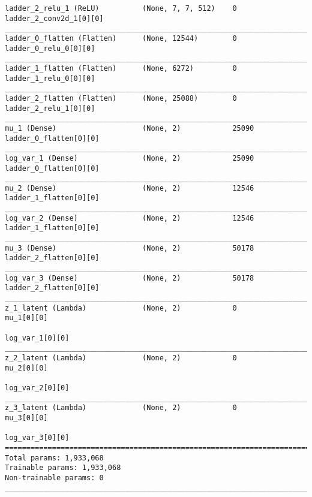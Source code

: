 \begin{lstlisting}[caption={\textsc{Mnist}-VLAE-GAN Encoder},captionpos=b,basicstyle=\tiny, label={lst:mnist-vlae-gan-encoder}]
ladder_2_relu_1 (ReLU)          (None, 7, 7, 512)    0           ladder_2_conv2d_1[0][0]
__________________________________________________________________________________________________
ladder_0_flatten (Flatten)      (None, 12544)        0           ladder_0_relu_0[0][0]
__________________________________________________________________________________________________
ladder_1_flatten (Flatten)      (None, 6272)         0           ladder_1_relu_0[0][0]
__________________________________________________________________________________________________
ladder_2_flatten (Flatten)      (None, 25088)        0           ladder_2_relu_1[0][0]
__________________________________________________________________________________________________
mu_1 (Dense)                    (None, 2)            25090       ladder_0_flatten[0][0]
__________________________________________________________________________________________________
log_var_1 (Dense)               (None, 2)            25090       ladder_0_flatten[0][0]
__________________________________________________________________________________________________
mu_2 (Dense)                    (None, 2)            12546       ladder_1_flatten[0][0]
__________________________________________________________________________________________________
log_var_2 (Dense)               (None, 2)            12546       ladder_1_flatten[0][0]
__________________________________________________________________________________________________
mu_3 (Dense)                    (None, 2)            50178       ladder_2_flatten[0][0]
__________________________________________________________________________________________________
log_var_3 (Dense)               (None, 2)            50178       ladder_2_flatten[0][0]
__________________________________________________________________________________________________
z_1_latent (Lambda)             (None, 2)            0           mu_1[0][0]
                                                                 log_var_1[0][0]
__________________________________________________________________________________________________
z_2_latent (Lambda)             (None, 2)            0           mu_2[0][0]
                                                                 log_var_2[0][0]
__________________________________________________________________________________________________
z_3_latent (Lambda)             (None, 2)            0           mu_3[0][0]
                                                                 log_var_3[0][0]
==================================================================================================
Total params: 1,933,068
Trainable params: 1,933,068
Non-trainable params: 0
__________________________________________________________________________________________________
\end{lstlisting}